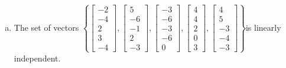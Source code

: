 \begin{exerciseAnswer}
\begin{enumerate}[(a)]
\item  The set of vectors \( \left\{ \left[\begin{array}{c}
-2 \\
-4 \\
2 \\
3 \\
-4
\end{array}\right] , \left[\begin{array}{c}
5 \\
-6 \\
-1 \\
2 \\
-3
\end{array}\right] , \left[\begin{array}{c}
-3 \\
-6 \\
-3 \\
-6 \\
0
\end{array}\right] , \left[\begin{array}{c}
4 \\
4 \\
2 \\
0 \\
3
\end{array}\right] , \left[\begin{array}{c}
4 \\
5 \\
-3 \\
-4 \\
-3
\end{array}\right] \right\} \)is linearly independent.
\end{enumerate}
    
\end{exerciseAnswer}
    
